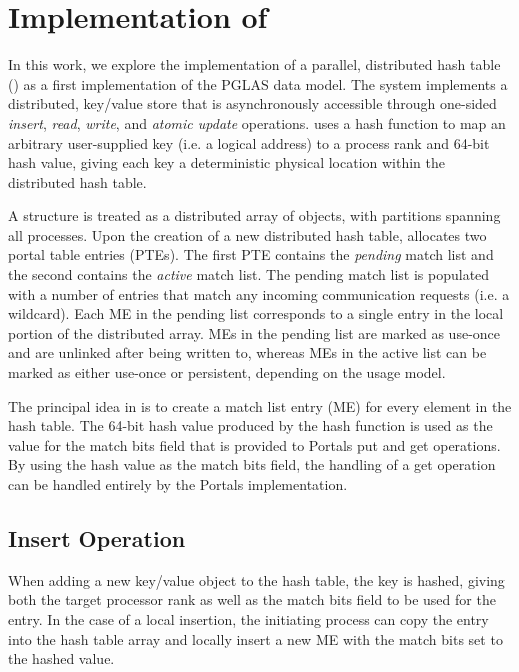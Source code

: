 \section{Implementation of \pdht}


In this work, we explore the implementation of a parallel, distributed hash
table (\pdht) as a first implementation of the PGLAS data model.
%
The \pdht system implements a distributed, key/value store that
is asynchronously accessible through one-sided {\em insert}, {\em
  read}, {\em write}, and {\em atomic update} operations.  \pdht uses
a hash function to map an arbitrary user-supplied key (i.e. a logical
address) to a process rank and 64-bit hash value, giving each key a
deterministic physical location within the distributed hash table.

A \pdht structure is treated as a distributed array of objects, with
partitions spanning all processes. Upon the creation of a new
distributed hash table, \pdht allocates two portal table
entries (PTEs). The first PTE contains the {\em pending} match list and the
second contains the {\em active} match list. The pending match list is
populated with a number of entries that match any incoming
communication requests (i.e. a wildcard). Each ME in the pending list
corresponds to a single entry in the local portion of the distributed
array. MEs in the pending list are marked as use-once and are unlinked
after being written to, whereas MEs in the active list can be marked as either
use-once or persistent, depending on the usage model.

The principal idea in \pdht is to create a match list entry (ME) for
every element in the hash table. The 64-bit hash value produced by the
hash function is used as the value for the match bits field that is provided
to Portals put and get operations. By using the hash value as
the match bits field, the handling of a get operation can be
handled entirely by the Portals implementation.


\vspace{-2mm}

\subsection{Insert Operation}

When adding a new key/value object to the hash table, the key is
hashed, giving both the target processor rank as well as the match
bits field to be used for the entry. In the case of a local insertion,
the initiating process can copy the entry into the hash table array and
locally insert a new ME with the match bits set to the hashed value. 

